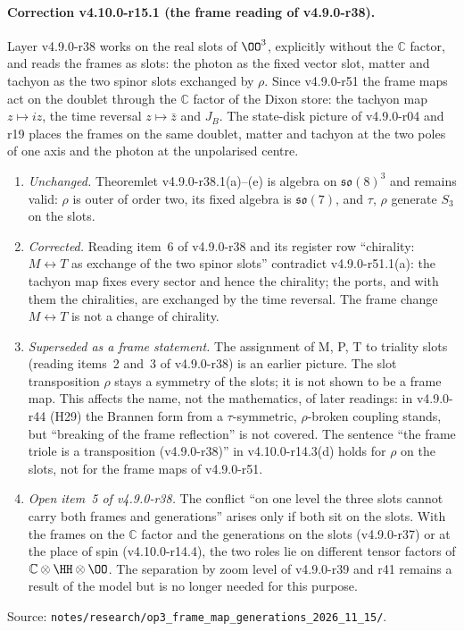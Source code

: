 \paragraph{Correction v4.10.0-r15.1 (the frame reading of v4.9.0-r38).}
Layer v4.9.0-r38 works on the real slots of \(\OO^3\), explicitly without the \(\mathbb C\) factor, and reads the frames as
slots: the photon as the fixed vector slot, matter and tachyon as the two spinor slots exchanged by \(\rho\).  Since
v4.9.0-r51 the frame maps act on the doublet through the \(\mathbb C\) factor of the Dixon store: the tachyon map
\(z\mapsto iz\), the time reversal \(z\mapsto\bar z\) and \(J_B\).  The state-disk picture of v4.9.0-r04 and r19 places the
frames on the same doublet, matter and tachyon at the two poles of one axis and the photon at the unpolarised centre.
\begin{enumerate}[leftmargin=2em]
\item[(a)] \emph{Unchanged.}  Theoremlet v4.9.0-r38.1(a)--(e) is algebra on \(\mathfrak{so}(8)^3\) and remains valid: \(\rho\) is outer of
order two, its fixed algebra is \(\mathfrak{so}(7)\), and \(\tau\), \(\rho\) generate \(S_3\) on the slots.
\item[(b)] \emph{Corrected.}  Reading item~6 of v4.9.0-r38 and its register row ``chirality: \(M\leftrightarrow T\) as exchange of the two
spinor slots'' contradict v4.9.0-r51.1(a): the tachyon map fixes every sector and hence the chirality; the ports, and with them
the chiralities, are exchanged by the time reversal.  The frame change \(M\leftrightarrow T\) is not a change of chirality.
\item[(c)] \emph{Superseded as a frame statement.}  The assignment of M, P, T to triality slots (reading items~2 and~3 of
v4.9.0-r38) is an earlier picture.  The slot transposition \(\rho\) stays a symmetry of the slots; it is not shown to be a frame
map.  This affects the name, not the mathematics, of later readings: in v4.9.0-r44 (H29) the Brannen form from a
\(\tau\)-symmetric, \(\rho\)-broken coupling stands, but ``breaking of the frame reflection'' is not covered.  The sentence ``the
frame triole is a transposition (v4.9.0-r38)'' in v4.10.0-r14.3(d) holds for \(\rho\) on the slots, not for the frame maps of
v4.9.0-r51.
\item[(d)] \emph{Open item~5 of v4.9.0-r38.}  The conflict ``on one level the three slots cannot carry both frames and generations''
arises only if both sit on the slots.  With the frames on the \(\mathbb C\) factor and the generations on the slots (v4.9.0-r37) or at
the place of spin (v4.10.0-r14.4), the two roles lie on different tensor factors of \(\mathbb C\otimes\HH\otimes\OO\).  The
separation by zoom level of v4.9.0-r39 and r41 remains a result of the model but is no longer needed for this purpose.
\end{enumerate}
Source: \texttt{notes/\allowbreak research/\allowbreak op3\_frame\_map\_generations\_2026\_11\_15/}.

